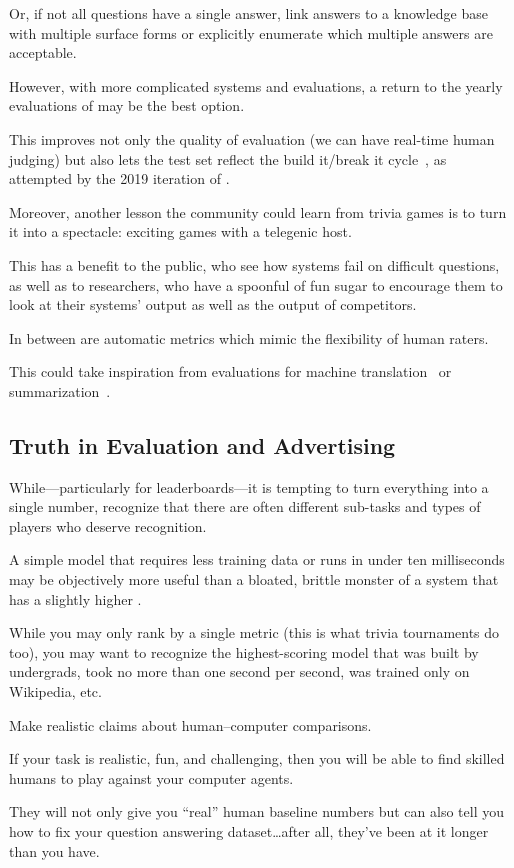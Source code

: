 Or, if not all questions have a single answer, link answers to a knowledge base with multiple surface forms or explicitly enumerate which multiple answers are acceptable.

However, with more complicated systems and evaluations, a return to the yearly evaluations of  may be the best option.

This improves not only the quality of evaluation (we can have real-time human judging) but also lets the test set reflect the build it/break it cycle~\citep{ruef-16}, as attempted by the 2019 iteration of .

Moreover, another lesson the  community could learn from trivia games is to turn it into a spectacle: exciting games with a telegenic host.

This has a benefit to the public, who see how  systems fail on difficult questions, as well as to  researchers, who have a spoonful of fun sugar to encourage them to look at their systems' output as well as the output of competitors.

In between are automatic metrics which mimic the flexibility of human raters.

This could take inspiration from evaluations for machine translation~\citep{papineni-02,specia-10} or summarization~\citep{lin-04}.

\subsection{Truth in Evaluation and Advertising}

While---particularly for leaderboards---it is tempting to turn everything into a single number, recognize that there are often different sub-tasks and types of players who deserve recognition.

A simple model that requires less training data or runs in under ten milliseconds may be objectively more useful than a bloated, brittle monster of a system that has a slightly higher \fone{}.

While you may only rank by a single metric (this is what trivia tournaments do too), you may want to recognize the highest-scoring model that was built by undergrads, took no more than one second per second, was trained only on Wikipedia, etc.

Make realistic claims about human--computer comparisons.

If your task is realistic, fun, and challenging, then you will be able to find skilled humans to play against your computer agents.

They will not only give you ``real'' human baseline numbers but can also tell you how to fix your question answering dataset\dots after all, they've been at it longer than you have.

